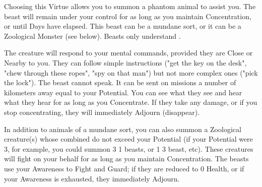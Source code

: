 
Choosing this Virtue allows you to summon a phantom animal to assist you.  The beast will remain under your control for as long as you maintain Concentration, or until Days have elapsed.  This beast can be a mundane sort, or it can be a Zoological Monster (see below).  Beasts only understand .

  The creature will respond to your mental commands, provided they are Close or Nearby to you.  They can follow simple instructions ("get the key on the desk", "chew through these ropes", "spy on that man") but not more complex ones ("pick the lock").  The beast cannot speak. It can be sent on missions a number of kilometers away equal to your Potential. You can see what they see and hear what they hear for as long as you Concentrate. If they take any damage, or if you stop concentrating, they will immediately Adjourn (disappear).

  In addition to animals of a mundane sort, you can also summon a Zoological creature(s) whose combined \HD do not exceed your Potential (if your Potential were 3, for example, you could summon 3 1 \HD beasts, or 1 3 \HD beast, etc).  These creatures will fight on your behalf for as long as you maintain Concentration.  The beasts use your Awareness \UD to Fight and Guard; if they are reduced to 0 Health, or if your Awareness is exhausted, they immediately Adjourn.




